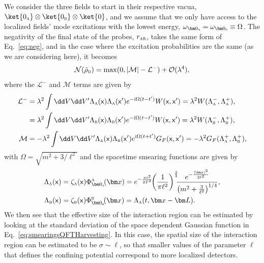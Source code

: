 \documentclass[letterpaper,12pt,titlepage,oneside,final]{book}
\newcommand{\mf}{\mathsf}%
\newcommand{\ii}{\mathrm{i}}
\renewcommand{\r}{\hat{\rho}}
\newcommand{\tc}[1]{\textsc{#1}}
\begin{document}
    We consider the three fields to start in their respective vacua, $\ket{0_\tc{a}}\otimes \ket{0_\tc{b}} \otimes \ket{0}$, and we assume that we only have access to the localized fields' mode excitations with the lowest energy, $\omega_{\bm 0_\tc{a}} = \omega_{\bm 0_\tc{b}} \equiv \Omega$. The negativity of the final state of the probes, $r_\tc{ab}$, takes the same form of Eq.~\eqref{eq:neg}, and in the case where the excitation probabilities are the same (as we are considering here), it becomes
    \begin{equation}
        \mathcal{N}(\r_\tc{d}) = \max(0, |\mathcal{M}| - \mathcal{L}^-) + \mathcal{O}(\lambda^4),
    \end{equation}
    where the $\mathcal{L}^-$ and $\mathcal{M}$ terms are given by
    \begin{align}
        \mathcal{L}^- &= \lambda^2 \int \dd V \dd V' \Lambda_\tc{a}(\mf x)\Lambda_\tc{a}(\mf x') e^{- \ii \Omega(t-t')} W(\mf x,\mf x') =\lambda^2 W(\Lambda_\tc{a}^-, \Lambda_\tc{a}^+),\label{eq:LQFTA}\\
        &= \lambda^2 \int \dd V \dd V' \Lambda_\tc{b}(\mf x)\Lambda_\tc{b}(\mf x') e^{- \ii\Omega (t-t')} W(\mf x,\mf x')=\lambda^2 W(\Lambda_\tc{b}^-, \Lambda_\tc{b}^+),\nonumber\\
        \mathcal{M} &= -\lambda^2 \int \dd V \dd V' \Lambda_\tc{a}(\mf x)\Lambda_\tc{b}(\mf x') e^{\ii \Omega(t+t')} G_F(\mf x,\mf x') = -\lambda^2 G_F(\Lambda_\tc{a}^+, \Lambda_\tc{b}^+),\nonumber
    \end{align}
    with $\Omega = \sqrt{m^2 + 3/\ell^2}$ and the spacetime smearing functions are given by
    \begin{align}
        \Lambda_\tc{a}(\mf x) &= \zeta_\tc{a}(\mf x) \Phi^{\tc{a}}_{\bm 0_\tc{a}}\!(\bm x) = e^{-\frac{\pi t^2}{2T^2}} \!\!\left(\frac{1}{\pi\ell^2}\right)^{\frac{3}{4}}\!\!\!\frac{e^{-\frac{|\bm x|^2}{2\ell^2}}}{\left(m^2 + \tfrac{3}{\ell^2}\right)^{1/4}},\nonumber\\
        \Lambda_\tc{b}(\mf x) &= \zeta_\tc{b}(\mf x) \Phi^{\tc{b}}_{\bm 0_\tc{b}}\!(\bm x) = \Lambda_\tc{a}(t,\bm x - \bm L).\label{eq:smearingsQFTHarvesting}
    \end{align}
    We then see that the effective size of the interaction region can be estimated by looking at the standard deviation of the space dependent Gaussian function in Eq.~\eqref{eq:smearingsQFTHarvesting}. In this case, the spatial size of the interaction region can be estimated to be $\sigma \sim \ell$, so that smaller values of the parameter $\ell$ that defines the confining potential correspond to more localized detectors.
\end{document}
